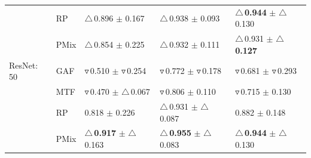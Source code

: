 \documentclass[final,3p,times,twocolumn]{elsarticle}
\newcommand{\purpole}[1]{\textcolor[rgb]{0.7,0.2,0.7}{#1}}
\begin{document}
\begin{table}[t!]
{\begin{tabular}{lllll}
 & RP & $\triangle$\,0.896 $\pm$ 0.167 & $\triangle$\,0.938 $\pm$ 0.093 & \textbf{$\triangle$\,0.944} $\pm$ $\triangle$\,0.130 \\
 & \purpole{PMix} & $\triangle$\,0.854 $\pm$ 0.225 & $\triangle$\,0.932 $\pm$ 0.111 & $\triangle$\,0.931 $\pm$ \textbf{$\triangle$\,0.127} \\
ResNet: 50 & GAF & $\triangledown$\,0.510 $\pm$ $\triangledown$\,0.254 & $\triangledown$\,0.772 $\pm$ $\triangledown$\,0.178 & $\triangledown$\,0.681 $\pm$ $\triangledown$\,0.293 \\
 & MTF & $\triangledown$\,0.470 $\pm$ $\triangle$\,0.067 & $\triangledown$\,0.806 $\pm$ 0.110 & $\triangledown$\,0.715 $\pm$ 0.130 \\
 & RP & 0.818 $\pm$ 0.226 & $\triangle$\,0.931 $\pm$ $\triangle$\,0.087 & 0.882 $\pm$ 0.148 \\
 & \purpole{PMix} & \textbf{$\triangle$\,0.917} $\pm$ $\triangle$\,0.163 & \textbf{$\triangle$\,0.955} $\pm$ $\triangle$\,0.083 & \textbf{$\triangle$\,0.944} $\pm$ $\triangle$\,0.130 \\
\bottomrule
\end{tabular}
    }
\end{table}
\end{document}
